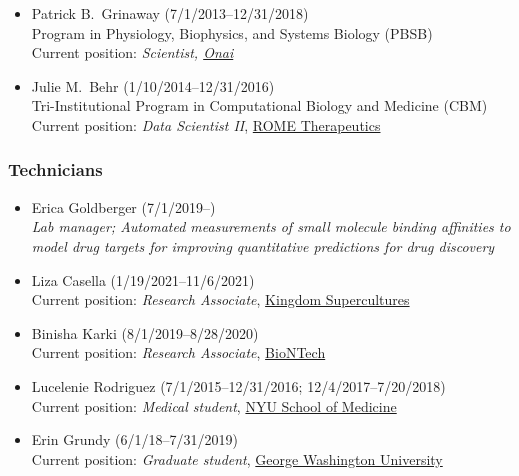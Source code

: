 \documentclass[10pt]{article}
\begin{document}
\begin{itemize}
  \item Patrick B.~Grinaway (7/1/2013--12/31/2018)\\
  Program in Physiology, Biophysics, and Systems Biology (PBSB)\\
  Current position: \emph{Scientist, \href{https://www.onai.com}{Onai}}

  \item Julie M.~Behr (1/10/2014--12/31/2016)\\
  Tri-Institutional Program in Computational Biology and Medicine (CBM)\\
  Current position: \emph{Data Scientist II}, \href{}{ROME Therapeutics} 

\end{itemize}
  
\subsubsection*{Technicians}

\begin{itemize}

  \item Erica Goldberger (7/1/2019--)\\
  \emph{Lab manager; Automated measurements of small molecule binding affinities to model drug targets for improving quantitative predictions for drug discovery}

  \item Liza Casella (1/19/2021--11/6/2021)\\
  Current position: \emph{Research Associate}, \href{https://www.kingdomsupercultures.com/}{Kingdom Supercultures}
  
  \item Binisha Karki (8/1/2019--8/28/2020)\\
  Current position: \emph{Research Associate}, \href{http://biontech.de}{BioNTech}

  \item Lucelenie Rodriguez (7/1/2015--12/31/2016; 12/4/2017--7/20/2018)\\
  Current position: \emph{Medical student}, \href{https://med.nyu.edu/education}{NYU School of Medicine}

  \item Erin Grundy (6/1/18--7/31/2019)\\
  Current position: \emph{Graduate student}, \href{https://smhs.gwu.edu/ibs/program/microbio-immunology}{George Washington University}
\end{itemize}
\end{document}
